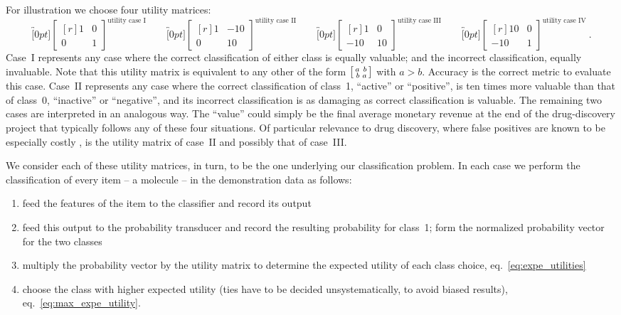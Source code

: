 \documentclass[a4paper,12pt,%
onecolumn,oneside,article,%
british%
]{memoir}
\renewcommand*{\|}[1][]{\nonscript\:#1\vert\nonscript\:\mathopen{}}
\newcommand*{\sect}{\S}%
\newcommand*{\eqn}{eq.}%
\newcommand*{\umatrix}[4]{\begin{bmatrix*}[r]#1&#2\\#3&#4\end{bmatrix*}}
\newcommand*{\sumatrix}[4]{\begin{bsmallmatrix*}[r]#1&#2\\#3&#4\end{bsmallmatrix*}}
\begin{document}
\smallskip


For illustration we choose four utility matrices:
\begin{equation}
  \label{eq:utility_matrices_demo}
  \overbracket[0pt]{\umatrix{1}{0}{0}{1}}^{\text{utility case I}} \qquad
  \overbracket[0pt]{\umatrix{1}{-10}{0}{10}}^{\text{utility case II}} \qquad
  \overbracket[0pt]{\umatrix{1}{0}{-10}{10}}^{\text{utility case III}} \qquad
  \overbracket[0pt]{\umatrix{10}{0}{-10}{1}}^{\text{utility case IV}} \ .
\end{equation}
Case~I represents any case where the correct classification of either class is equally valuable; and the incorrect classification, equally invaluable. Note that this utility matrix is equivalent to any other of the form $\sumatrix{a}{b}{b}{a}$ with $a>b$. Accuracy is the correct metric to evaluate this case. Case~II represents any case where the correct classification of class~1, \enquote{active} or \enquote{positive}, is ten times more valuable than that of class~0, \enquote{inactive} or \enquote{negative}, and its incorrect classification is as damaging as correct classification is valuable. The remaining two cases are interpreted in an analogous way. The \enquote{value} could simply be the final average monetary revenue at the end of the drug-discovery project that typically follows any of these four situations. Of particular relevance to drug discovery, where false positives are known to be especially costly \autocites{sinketal2010,hingoranietal2019}, is the utility matrix of case~II and possibly that of case~III.

We consider each of these utility matrices, in turn, to be the one underlying our classification problem. In each case we perform the classification of every item -- a molecule -- in the demonstration data as follows:
\begin{enumerate}[label=\arabic*.]
\item feed the features of the item to the classifier and record its output
\item feed this output to the probability transducer and record the resulting probability for class~1; form the normalized probability vector for the two classes 
\item multiply the probability vector by the utility matrix to determine the expected utility of each class choice, \eqn~\eqref{eq:expe_utilities}
\item choose the class with higher expected utility (ties have to be decided unsystematically, to avoid biased results), \eqn~\eqref{eq:max_expe_utility}.
\end{enumerate}
\end{document}

